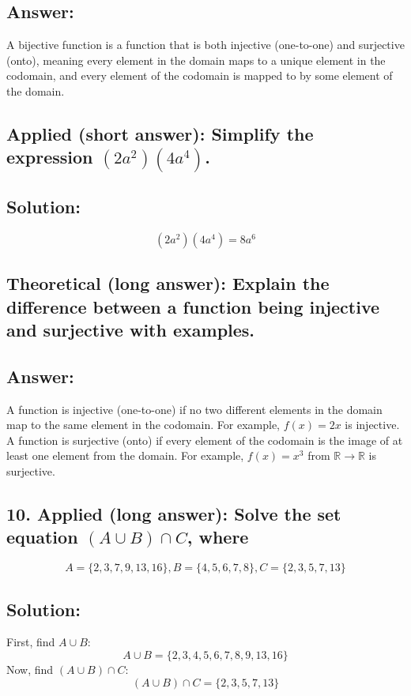 \documentclass[12pt]{article}
\begin{document}
\subsection{Answer:} A bijective function is a function that is both injective (one-to-one) and surjective (onto), meaning every element in the domain maps to a unique element in the codomain, and every element of the codomain is mapped to by some element of the domain.

\subsection{Applied (short answer): Simplify the expression \( (2a^2)(4a^4) \).}

\subsection{Solution:}
\[
(2a^2)(4a^4) = 8a^6
\]

\subsection{Theoretical (long answer): Explain the difference between a function being injective and surjective with examples.}

\subsection{Answer:} 
A function is injective (one-to-one) if no two different elements in the domain map to the same element in the codomain. For example, \( f(x) = 2x \) is injective. A function is surjective (onto) if every element of the codomain is the image of at least one element from the domain. For example, \( f(x) = x^3 \) from \( \mathbb{R} \to \mathbb{R} \) is surjective.

\subsection{10. Applied (long answer): Solve the set equation \( (A \cup B) \cap C \), where}
\[
A = \{2, 3, 7, 9, 13, 16\}, B = \{4, 5, 6, 7, 8\}, C = \{2, 3, 5, 7, 13\}
\]

\subsection{Solution:}
First, find \( A \cup B \):
\[
A \cup B = \{2, 3, 4, 5, 6, 7, 8, 9, 13, 16\}
\]
Now, find \( (A \cup B) \cap C \):
\[
(A \cup B) \cap C = \{2, 3, 5, 7, 13\}
\]
\end{document}

